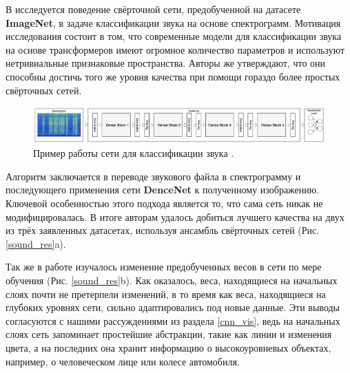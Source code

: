 \documentclass[12pt, fleqn]{article}
\begin{document}
    В \cite{palanisamy2020rethinking} исследуется поведение свёрточной сети, предобученной на датасете \textbf{ImageNet}, в 
    задаче классификации звука на основе спектрограмм. Мотивация исследования состоит в том, что современные модели для 
    классификации звука на основе трансформеров имеют огромное количество параметров и используют нетривиальные признаковые 
    пространства. Авторы же утверждают, что они способны достичь того же уровня качества при помощи гораздо более простых 
    свёрточных сетей.

    \begin{figure}[ht]
        \centering
        \includegraphics[scale=0.55]{pics/cnn_sound.png}
        \caption{Пример работы сети для классификации звука \cite{palanisamy2020rethinking}.}
        \label{cnn_sound}
    \end{figure}

    Алгоритм заключается в переводе звукового файла в спектрограмму и последующего применения сети \textbf{DenceNet} 
    \cite{huang2017densely} к полученному изображению. Ключевой особенностью этого подхода является то, что сама сеть никак 
    не модифицировалась. В итоге авторам удалось добиться лучшего качества на двух из трёх заявленных датасетах, используя 
    ансамбль свёрточных сетей (Рис. \ref{sound_res}a).

    Так же в работе изучалось изменение предобученных весов в сети по мере обучения (Рис. \ref{sound_res}b). Как оказалось, веса, находящиеся на начальных 
    слоях почти не претерпели изменений, в то время как веса, находящиеся на глубоких уровнях сети, сильно адаптировались под новые данные. 
    Эти выводы согласуются с нашими рассуждениями из раздела \ref{cnn_vis}, ведь на начальных слоях сеть запоминает простейшие абстракции, 
    такие как линии и изменения цвета, а на последних она хранит информацию о высокоуровневых объектах, например, о человеческом лице или 
    колесе автомобиля.
\end{document}
